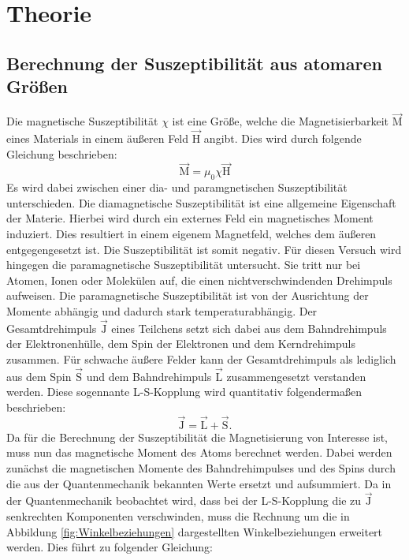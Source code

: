 \section{Theorie}
\label{sec:Theorie}

\subsection{Berechnung der Suszeptibilität aus atomaren Größen}
Die magnetische Suszeptibilität $\chi$ ist eine Größe, welche die Magnetisierbarkeit $\vec{\text{M}}$ eines Materials in einem äußeren Feld $\vec{\text{H}}$ angibt.
Dies wird durch folgende Gleichung beschrieben:
\begin{equation}
  \vec{\text{M}} = {\mu}_0 \chi \vec{\text{H}}
  \label{eqn:magnetisierung}
\end{equation}
Es wird dabei zwischen einer dia- und paramgnetischen Suszeptibilität unterschieden.
Die diamagnetische Suszeptibilität ist eine allgemeine Eigenschaft der Materie.
Hierbei wird durch ein externes Feld ein magnetisches Moment induziert.
Dies resultiert in einem eigenem Magnetfeld, welches dem äußeren entgegengesetzt ist.
Die Suszeptibilität ist somit negativ.
Für diesen Versuch wird hingegen die paramagnetische Suszeptibilität untersucht.
Sie tritt nur bei Atomen, Ionen oder Molekülen auf, die einen nichtverschwindenden Drehimpuls aufweisen.
Die paramagnetische Suszeptibilität ist von der Ausrichtung der Momente abhängig und dadurch stark temperaturabhängig.
Der Gesamtdrehimpuls $\vec{\text{J}}$ eines Teilchens setzt sich dabei aus dem Bahndrehimpuls der Elektronenhülle, dem Spin der Elektronen und dem Kerndrehimpuls zusammen.
Für schwache äußere Felder kann der Gesamtdrehimpuls als lediglich aus dem Spin $\vec{\text{S}}$ und dem Bahndrehimpuls $\vec{\text{L}}$ zusammengesetzt verstanden werden.
Diese sogennante L-S-Kopplung wird quantitativ folgendermaßen beschrieben:
\begin{equation}
  \vec{\text{J}} = \vec{\text{L}} + \vec{\text{S}} .
\end{equation}
Da für die Berechnung der Suszeptibilität die Magnetisierung von Interesse ist, muss nun das magnetische Moment des Atoms berechnet werden.
Dabei werden zunächst die magnetischen Momente des Bahndrehimpulses und des Spins durch die aus der Quantenmechanik bekannten Werte ersetzt und aufsummiert.
Da in der Quantenmechanik beobachtet wird, dass bei der L-S-Kopplung die zu $\vec{\text{J}}$ senkrechten Komponenten verschwinden, muss die Rechnung um die in
Abbildung \ref{fig:Winkelbeziehungen} dargestellten Winkelbeziehungen erweitert werden. Dies führt zu folgender Gleichung:
